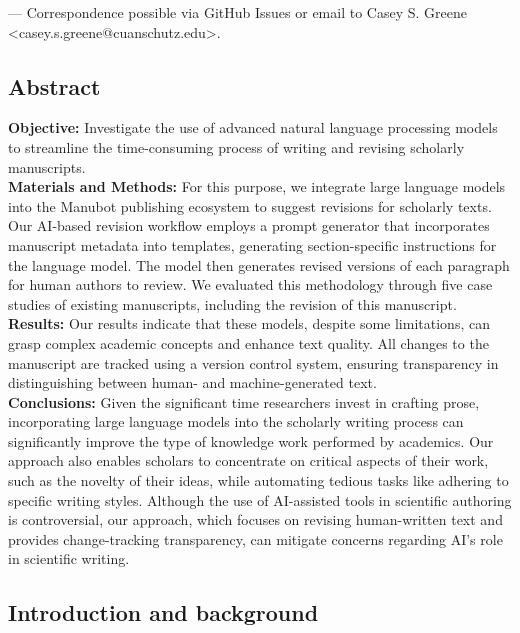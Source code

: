 \documentclass[
]{article}
\begin{document}
\leavevmode{}%
\Letter --- Correspondence possible via GitHub Issues
or email to
Casey S. Greene \textless casey.s.greene@cuanschutz.edu\textgreater.

\subsection{Abstract}

\textbf{Objective:} Investigate the use of advanced natural language processing models to streamline the time-consuming process of writing and revising scholarly manuscripts.\\
\textbf{Materials and Methods:} For this purpose, we integrate large language models into the Manubot publishing ecosystem to suggest revisions for scholarly texts.
Our AI-based revision workflow employs a prompt generator that incorporates manuscript metadata into templates, generating section-specific instructions for the language model.
The model then generates revised versions of each paragraph for human authors to review.
We evaluated this methodology through five case studies of existing manuscripts, including the revision of this manuscript.\\
\textbf{Results:} Our results indicate that these models, despite some limitations, can grasp complex academic concepts and enhance text quality.
All changes to the manuscript are tracked using a version control system, ensuring transparency in distinguishing between human- and machine-generated text.\\
\textbf{Conclusions:} Given the significant time researchers invest in crafting prose, incorporating large language models into the scholarly writing process can significantly improve the type of knowledge work performed by academics.
Our approach also enables scholars to concentrate on critical aspects of their work, such as the novelty of their ideas, while automating tedious tasks like adhering to specific writing styles.
Although the use of AI-assisted tools in scientific authoring is controversial, our approach, which focuses on revising human-written text and provides change-tracking transparency, can mitigate concerns regarding AI's role in scientific writing.

\subsection{Introduction and background}
\end{document}
